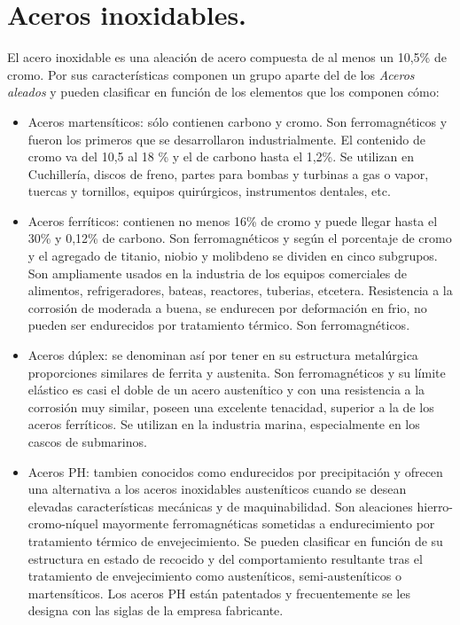 \section{Aceros inoxidables.}

El acero inoxidable es una aleación de acero compuesta de al menos un 10,5\% de cromo. Por sus características componen un grupo aparte del de los \emph{Aceros aleados} y pueden clasificar en función de los elementos que los componen cómo:

\begin{itemize}
	\item Aceros martensíticos: sólo contienen carbono y cromo. Son ferromagnéticos y fueron los primeros que se desarrollaron industrialmente. El contenido de cromo va del 10,5 al 18 \% y el de carbono hasta el 1,2\%. Se utilizan en Cuchillería, discos de freno, partes para bombas y turbinas a gas o vapor, tuercas y tornillos, equipos quirúrgicos, instrumentos dentales,  etc.
	\item Aceros ferríticos: contienen no menos 16\% de cromo y puede llegar hasta el 30\% y 0,12\% de carbono. Son ferromagnéticos y según el porcentaje de cromo y el agregado de titanio, niobio y molibdeno se dividen en cinco subgrupos. Son ampliamente usados en la industria de los equipos comerciales de alimentos, refrigeradores, bateas, reactores, tuberias, etcetera. Resistencia a la corrosión de moderada a buena, se endurecen por deformación en frio, no pueden ser endurecidos por tratamiento térmico. Son ferromagnéticos.
	\item Aceros dúplex: se denominan así por tener en su estructura metalúrgica proporciones similares de ferrita y austenita. Son ferromagnéticos y su límite elástico es casi el doble de un acero austenítico y con una resistencia a la corrosión muy similar, poseen una excelente tenacidad, superior a la de los aceros ferríticos. Se utilizan en la industria marina, especialmente en los cascos de submarinos.
	\item Aceros PH: tambien conocidos como endurecidos por precipitación y ofrecen una alternativa a los aceros inoxidables austeníticos cuando se desean elevadas características mecánicas y de maquinabilidad. Son aleaciones hierro-cromo-níquel mayormente ferromagnéticas sometidas a endurecimiento por tratamiento térmico de envejecimiento. Se pueden clasificar en función de su estructura en estado de recocido y del comportamiento resultante tras el tratamiento de envejecimiento como austeníticos, semi-austeníticos o martensíticos. Los aceros PH están patentados y frecuentemente se les designa con las siglas de la empresa fabricante. 

\end{itemize}
